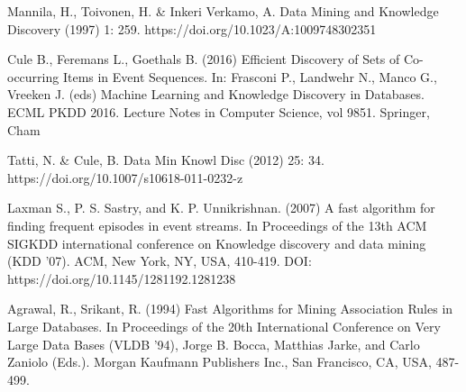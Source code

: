 \documentclass{scrartcl}
\theoremstyle{definition}
\begin{document}
\begin{thebibliography}{99}

 Mannila, H., Toivonen, H. \& Inkeri Verkamo, A. Data Mining and Knowledge Discovery (1997) 1: 259. https://doi.org/10.1023/A:1009748302351

 Cule B., Feremans L., Goethals B. (2016) Efficient Discovery of Sets of Co-occurring Items in Event Sequences. In: Frasconi P., Landwehr N., Manco G., Vreeken J. (eds) Machine Learning and Knowledge Discovery in Databases. ECML PKDD 2016. Lecture Notes in Computer Science, vol 9851. Springer, Cham

 Tatti, N. \& Cule, B. Data Min Knowl Disc (2012) 25: 34. https://doi.org/10.1007/s10618-011-0232-z

 Laxman S., P. S. Sastry, and K. P. Unnikrishnan. (2007) A fast algorithm for finding frequent episodes in event streams. In Proceedings of the 13th ACM SIGKDD international conference on Knowledge discovery and data mining (KDD '07). ACM, New York, NY, USA, 410-419. DOI: https://doi.org/10.1145/1281192.1281238

 Agrawal, R., Srikant, R. (1994) Fast Algorithms for Mining Association Rules in Large Databases. In Proceedings of the 20th International Conference on Very Large Data Bases (VLDB '94), Jorge B. Bocca, Matthias Jarke, and Carlo Zaniolo (Eds.). Morgan Kaufmann Publishers Inc., San Francisco, CA, USA, 487-499.

\end{thebibliography}
\end{document}
